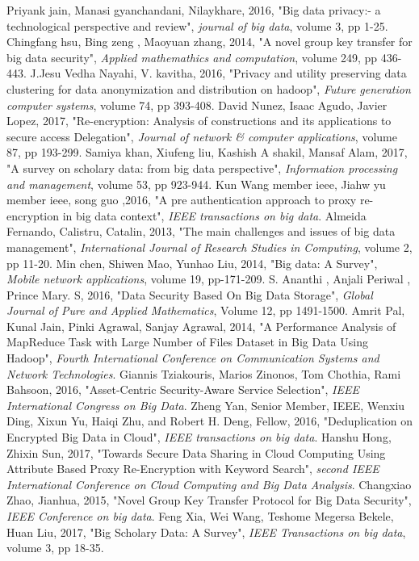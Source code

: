 \documentclass[10pt,a4paper,journal]{IEEEtran}
\begin{document}
\begin{thebibliography}{15}
Priyank jain, Manasi gyanchandani, Nilaykhare, 2016, "Big data privacy:- a technological perspective and review", \textit{journal of big data}, volume 3, pp 1-25.
Chingfang hsu, Bing zeng , Maoyuan zhang, 2014, "A novel group key transfer for big data security", \textit{Applied mathemathics and computation}, volume 249, pp 436-443.
J.Jesu Vedha Nayahi, V. kavitha, 2016, "Privacy and utility preserving data clustering for data anonymization and distribution on hadoop", \textit{Future generation computer systems}, volume 74, pp 393-408.
David Nunez, Isaac Agudo, Javier Lopez, 2017, "Re-encryption: Analysis of constructions and its applications to secure access Delegation", \textit{Journal of network & computer applications}, volume 87, pp 193-299.
Samiya khan, Xiufeng liu, Kashish A shakil, Mansaf Alam, 2017, "A survey on scholary data: from big data perspective", \textit{Information processing and management}, volume 53, pp 923-944.
 Kun Wang member ieee, Jiahw yu member ieee, song guo ,2016, "A pre authentication approach to proxy re-encryption in big data context", \textit{IEEE transactions on big data}.
Almeida  Fernando,  Calistru, Catalin, 2013, "The main challenges and issues of big data management", \textit{International Journal of Research Studies in Computing}, volume 2, pp 11-20.
Min chen, Shiwen Mao, Yunhao Liu, 2014, "Big data: A Survey", \textit{Mobile network applications}, volume 19, pp-171-209.
S. Ananthi , Anjali Periwal , Prince Mary. S,  2016, "Data Security Based On Big Data Storage", \textit{Global Journal of Pure and Applied Mathematics}, Volume 12, pp  1491-1500.
Amrit Pal, Kunal Jain, Pinki Agrawal, Sanjay Agrawal, 2014, "A Performance Analysis of MapReduce Task with Large Number of Files Dataset in Big Data Using Hadoop", \textit{Fourth International Conference on Communication Systems and Network Technologies}.
Giannis Tziakouris,  Marios Zinonos,  Tom Chothia,  Rami Bahsoon, 2016, "Asset-Centric Security-Aware Service Selection", \textit{IEEE International Congress on Big Data}.
Zheng Yan, Senior Member, IEEE, Wenxiu Ding, Xixun Yu, Haiqi Zhu, and Robert H. Deng, Fellow, 2016, "Deduplication on Encrypted Big Data in Cloud", \textit{IEEE transactions on big data}.
Hanshu Hong, Zhixin Sun, 2017, "Towards Secure Data Sharing in Cloud Computing Using Attribute Based Proxy Re-Encryption with Keyword Search", \textit{second IEEE International Conference on Cloud Computing and Big Data Analysis}.
Changxiao  Zhao, Jianhua, 2015, "Novel Group Key Transfer Protocol for Big Data Security", \textit{IEEE Conference on big data}.
Feng Xia, Wei Wang, Teshome Megersa Bekele, Huan Liu, 2017, "Big Scholary Data: A Survey", \textit{IEEE Transactions on big data}, volume 3, pp 18-35.
\end{thebibliography}
 
\end{document}
